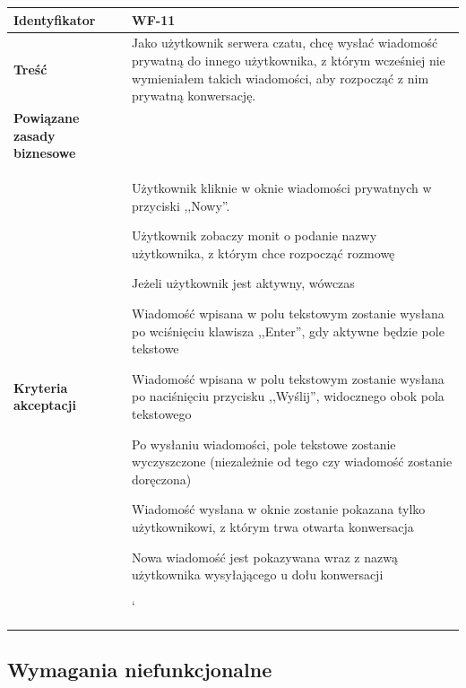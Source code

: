 \begin{tabular}{ | l | l | }
	\hline
		\textbf{Identyfikator} & 
		WF-11
		\\
		
	\hline
		\textbf{Treść} & \parbox[t]{11cm}{
			Jako użytkownik serwera czatu, chcę wysłać wiadomość 
			prywatną do innego użytkownika, z którym wcześniej nie
			wymieniałem takich wiadomości, aby rozpocząć z nim
			prywatną konwersację.
		}\\
		 
	\hline
		\parbox[t]{4cm}{\textbf{Powiązane zasady biznesowe}} & \parbox[t]{11cm}{
			
			
		}\\
		
	\hline
		\parbox[t]{4cm}{\textbf{Kryteria akceptacji}} & \parbox[t]{11cm}{
			\begin{enumreq}
				\item Użytkownik kliknie w oknie wiadomości
				prywatnych w przyciski ,,Nowy''.
				\item Użytkownik zobaczy monit o podanie nazwy
				użytkownika, z którym chce rozpocząć rozmowę
				\item Jeżeli użytkownik jest aktywny, wówczas 
				\item Wiadomość wpisana w polu tekstowym zostanie
				wysłana po wciśnięciu klawisza ,,Enter'', gdy
				aktywne
				będzie pole tekstowe
				\item Wiadomość wpisana w polu tekstowym zostanie
				wysłana po naciśnięciu przycisku ,,Wyślij'',
				widocznego obok pola tekstowego
				\item Po wysłaniu wiadomości, pole tekstowe zostanie
				wyczyszczone (niezależnie od tego czy wiadomość
				zostanie doręczona)
				\item Wiadomość wysłana w oknie zostanie pokazana
				tylko użytkownikowi, z którym trwa otwarta
				konwersacja
				\item Nowa wiadomość jest pokazywana wraz z nazwą
				użytkownika wysyłającego u dołu konwersacji
			\end{enumreq}`								
			}
		\\

	\hline
\end{tabular}

\subsection{Wymagania niefunkcjonalne}


